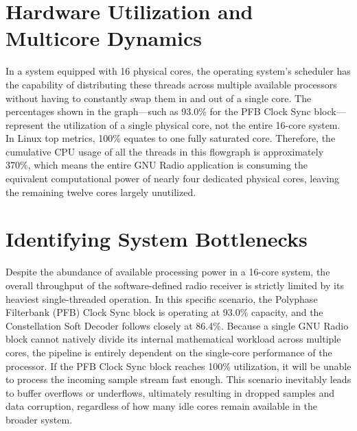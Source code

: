 \section{Hardware Utilization and Multicore Dynamics}

In a system equipped with 16 physical cores, the operating system's scheduler has the capability of distributing these threads across multiple available processors without having to constantly swap them in and out of a single core. The percentages shown in the graph—such as 93.0\% for the PFB Clock Sync block—represent the utilization of a single physical core, not the entire 16-core system. In Linux top metrics, 100\% equates to one fully saturated core. Therefore, the cumulative CPU usage of all the threads in this flowgraph is approximately 370\%, which means the entire GNU Radio application is consuming the equivalent computational power of nearly four dedicated physical cores, leaving the remaining twelve cores largely unutilized.

\section{Identifying System Bottlenecks}

Despite the abundance of available processing power in a 16-core system, the overall throughput of the software-defined radio receiver is strictly limited by its heaviest single-threaded operation. In this specific scenario, the Polyphase Filterbank (PFB) Clock Sync block is operating at 93.0\% capacity, and the Constellation Soft Decoder follows closely at 86.4\%. Because a single GNU Radio block cannot natively divide its internal mathematical workload across multiple cores, the pipeline is entirely dependent on the single-core performance of the processor. If the PFB Clock Sync block reaches 100\% utilization, it will be unable to process the incoming sample stream fast enough. This scenario inevitably leads to buffer overflows or underflows, ultimately resulting in dropped samples and data corruption, regardless of how many idle cores remain available in the broader system.